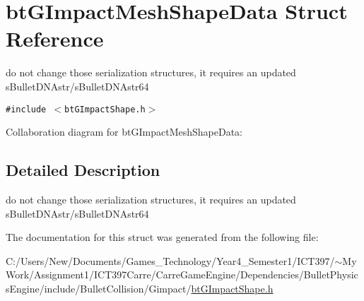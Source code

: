 \hypertarget{structbt_g_impact_mesh_shape_data}{
\section{btGImpactMeshShapeData Struct Reference}
\label{structbt_g_impact_mesh_shape_data}
}
do not change those serialization structures, it requires an updated sBulletDNAstr/sBulletDNAstr64  


{\tt \#include $<$btGImpactShape.h$>$}

Collaboration diagram for btGImpactMeshShapeData:

\subsection{Detailed Description}
do not change those serialization structures, it requires an updated sBulletDNAstr/sBulletDNAstr64 

The documentation for this struct was generated from the following file:\begin{CompactItemize}
\item 
C:/Users/New/Documents/Games\_\-Technology/Year4\_\-Semester1/ICT397/$\sim$My Work/Assignment1/ICT397Carre/CarreGameEngine/Dependencies/BulletPhysicsEngine/include/BulletCollision/Gimpact/\hyperlink{bt_g_impact_shape_8h}{btGImpactShape.h}\end{CompactItemize}
